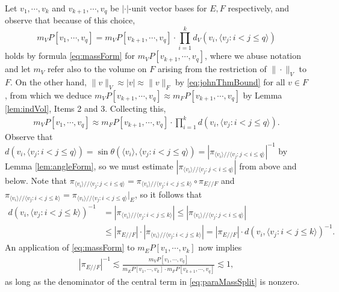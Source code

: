 \documentclass[11pt]{amsart}
\theoremstyle{theorem}
\theoremstyle{definition}
\numberwithin{equation}{section}
\newcommand{\ds}{/ \! /}
\begin{document}
Let $v_1, \cdots, v_k$ and $v_{k + 1}, \cdots, v_q$ be $|\cdot|$-unit vector bases for $E, F$ respectively, and observe that because of this choice,
\[
m_V P[v_1, \cdots, v_q] = m_V P[v_{k + 1}, \cdots, v_q] \cdot \prod_{i =1 }^k d_V(v_i, \langle v_j : i < j \leq q \rangle )
\]
holds by formula \eqref{eq:massForm} for $m_V P[v_{k + 1}, \cdots, v_q]$, where we abuse notation and let $m_V $ refer also to the volume on $F$ arising from the restriction of $\|\cdot\|_V$ to $F$. On the other hand, $\|v\|_V \approx |v| \approx \|v\|_F$ by \eqref{eq:johnThmBound} for all $v \in F$, from which we deduce $m_V P[v_{k + 1}, \cdots, v_q] \approx m_F P[v_{k + 1}, \cdots, v_q]$ by Lemma \ref{lem:indVol}, Items 2 and 3. Collecting this,
\begin{align}\label{eq:splitParaEst2}
m_V P[v_1, \cdots, v_q] \approx m_F P[v_{k + 1}, \cdots, v_q] \cdot \prod_{i = 1}^k d(v_i, \langle v_j : i < j \leq q \rangle ).
\end{align}
Observe that $d(v_i, \langle v_j : i < j \leq q \rangle) = \sin \theta(\langle v_i \rangle, \langle v_j : i < j \leq q \rangle) = | \pi_{\langle v_i \rangle \ds \langle v_j : j < i \leq q \rangle}|^{-1}$ by Lemma \ref{lem:angleForm}, so we must estimate $| \pi_{\langle v_i \rangle \ds \langle v_j : j < i \leq q \rangle}|$ from above and below. Note that $\pi_{\langle v_i \rangle \ds \langle v_j : j < i \leq q \rangle} = \pi_{\langle v_i \rangle \ds \langle v_j : i < j \leq k \rangle} \circ \pi_{E \ds F}$ and $\pi_{\langle v_i \rangle \ds \langle v_j : i < j \leq k \rangle} = \pi_{\langle v_i \rangle \ds \langle v_j : i < j \leq q \rangle} |_E$, so it follows that
\begin{align*}
d(v_i, \langle v_j : i < j \leq k \rangle )^{-1} & =  |\pi_{\langle v_i \rangle \ds \langle v_j : i < j \leq k \rangle}|  \leq | \pi_{\langle v_i \rangle \ds \langle v_j : j < i  \leq q \rangle}| \\ & \leq |\pi_{E \ds F}| \cdot |\pi_{\langle v_i \rangle \ds \langle v_j : i < j \leq k \rangle}| 
= |\pi_{E \ds F}| \cdot d(v_i, \langle v_j : i < j \leq k \rangle )^{-1}.
\end{align*}
An application of \eqref{eq:massForm} to $m_E P[v_1, \cdots, v_k]$ now implies
\begin{align} \label{eq:paraMassSplit}
|\pi_{E \ds F}|^{-1} \lesssim \frac{m_V P[v_1, \cdots, v_q]}{m_E P[v_1, \cdots, v_k] \cdot m_F P[v_{k + 1}, \cdots, v_q]} \lesssim 1,
\end{align}
as long as the denominator of the central term in \eqref{eq:paraMassSplit} is nonzero.
\end{document}
